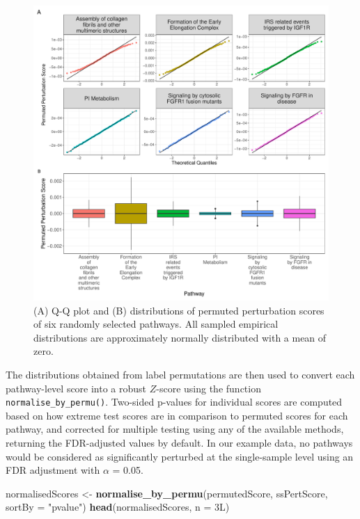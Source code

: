 \documentclass[9pt,a4paper,]{extarticle}
\newenvironment{Shaded}{\begin{snugshade}}{\end{snugshade}}
\newcommand{\AttributeTok}[1]{\textcolor[rgb]{0.13,0.29,0.53}{#1}}
\newcommand{\FunctionTok}[1]{\textcolor[rgb]{0.13,0.29,0.53}{\textbf{#1}}}
\newcommand{\NormalTok}[1]{#1}
\newcommand{\OtherTok}[1]{\textcolor[rgb]{0.56,0.35,0.01}{#1}}
\newcommand{\StringTok}[1]{\textcolor[rgb]{0.31,0.60,0.02}{#1}}
\begin{document}
\begin{figure}[p]

{\centering \includegraphics[width=1\linewidth]{sSNAPPY_paper_files/figure-latex/Figure3-1} 

}

\caption{(A) Q-Q plot and (B) distributions of permuted perturbation scores of six randomly selected pathways. All sampled empirical distributions are approximately normally distributed with a mean of zero.}\label{fig:Figure3}
\end{figure}

The distributions obtained from label permutations are then used to convert each pathway-level score into a robust \(Z\)-score using the function \texttt{normalise\_by\_permu()}.
Two-sided p-values for individual scores are computed based on how extreme test scores are in comparison to permuted scores for each pathway, and corrected for multiple testing using any of the available methods, returning the FDR-adjusted values by default.
In our example data, no pathways would be considered as significantly perturbed at the single-sample level using an FDR adjustment with \(\alpha\) = 0.05.

\begin{Shaded}
\begin{Highlighting}[]
\NormalTok{normalisedScores }\OtherTok{\textless{}{-}} \FunctionTok{normalise\_by\_permu}\NormalTok{(permutedScore, ssPertScore, }
                                       \AttributeTok{sortBy =} \StringTok{"pvalue"}\NormalTok{)}
\FunctionTok{head}\NormalTok{(normalisedScores, }\AttributeTok{n =}\NormalTok{ 3L)}
\end{Highlighting}
\end{Shaded}
\end{document}
